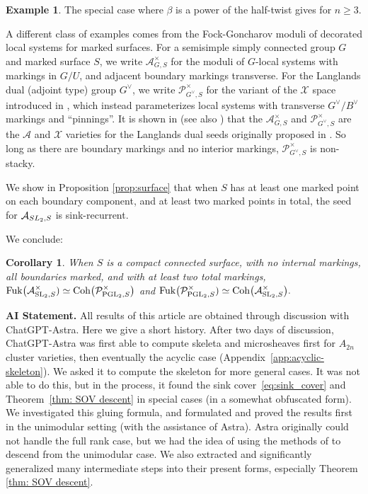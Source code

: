 \documentclass[12pt, letter]{amsart}
\DeclareMathOperator{\Fuk}{Fuk}
\newtheorem{corollary}[dummy]{Corollary}
\theoremstyle{definition}
\newtheorem{example}[dummy]{Example}
\begin{document}
\begin{example}
    The special case where $\beta$ is a power of the half-twist gives \cite[Conjecture~1.5, equation~(35)]{Goncharov-Shen} for $n \ge 3$. 
\end{example}
 
A different class of examples comes from the Fock-Goncharov \cite{FG06} moduli of decorated local systems for marked surfaces.  
For a semisimple simply connected group $G$ and marked surface $S$, we write $\mathcal{A}_{G, S}^\times$ for the moduli of $G$-local systems with markings in $G/U$, and adjacent boundary markings transverse.  For the Langlands dual (adjoint type) group $G^\vee$, we write $\mathcal{P}^\times_{G^\vee, S}$ for the variant of the $\mathcal{X}$ space introduced in \cite{GS-quantum}, which  instead parameterizes local systems with transverse $G^\vee/B^\vee$ markings and ``pinnings''.  It is shown in \cite{GS-quantum} (see also \cite{Goncharov-Shen, Shen-Poisson, IO-Wilson, IOS}) that the 
$\mathcal{A}_{G, S}^\times$ and $\mathcal{P}^\times_{G^\vee, S}$ are the $\mathcal{A}$ and $\mathcal{X}$ varieties for the Langlands dual seeds originally proposed in \cite{FG06}.  So long as there are boundary markings and no interior markings, $\mathcal{P}^\times_{G^\vee, S}$ is non-stacky.   

We show in Proposition \ref{prop:surface} that when \(S\) has at least one marked point on each boundary component, and at least two marked points in total, the seed for \(\mathcal{A}_{SL_2, S}\) is sink-recurrent. 

We conclude: 

\begin{corollary}
When $S$ is a compact connected surface, with no internal markings, all boundaries marked, and with at least two total markings,  
$\Fuk\bigl(\mathcal A^\times_{\mathrm{SL}_2,S})
 \simeq \Coh\bigl(\mathcal \cP^\times_{\mathrm{PGL}_2,S}\bigr)$ and $\Fuk\bigl(\mathcal \cP^\times_{\mathrm{PGL}_2,S})
 \simeq \Coh\bigl(\mathcal A^\times_{\mathrm{SL}_2,S}\bigr).$ 
\end{corollary}

{\bf AI Statement.} 
All results of this article are obtained through discussion with ChatGPT-Astra.  Here we give a short history. 
After two days of discussion, ChatGPT-Astra was first able to compute skeleta and microsheaves first for $A_{2n}$ cluster varieties, then eventually the acyclic case (Appendix~\ref{app:acyclic-skeleton}).
We asked it to compute the skeleton for more general cases. It was not able to do this, but in the process, it found the sink cover~\eqref{eq:sink_cover} and Theorem~\ref{thm: SOV descent} in special cases (in a somewhat obfuscated form). 
We investigated this gluing formula, and formulated and proved the results first in the unimodular setting (with the assistance of Astra).
Astra originally could not handle the full rank case, but we had the idea of using the methods of \cite{Sh21} to descend from the unimodular case.  We also extracted and significantly generalized many intermediate steps into their present forms, especially Theorem \ref{thm: SOV descent}. 
\end{document}

